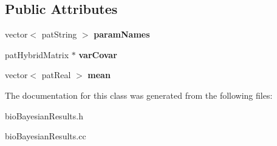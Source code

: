 \subsection*{Public Attributes}
\begin{DoxyCompactItemize}
\item 
\mbox{\label{classbio_bayesian_results_af7f5c9b0ff7ff04f12d0ab65a64aa6c2}} 
vector$<$ pat\+String $>$ {\bfseries param\+Names}
\item 
\mbox{\label{classbio_bayesian_results_ad3f390c3b245c0793801915097343769}} 
pat\+Hybrid\+Matrix $\ast$ {\bfseries var\+Covar}
\item 
\mbox{\label{classbio_bayesian_results_a61c9d40914afcf2ebd65e0a43d553230}} 
vector$<$ pat\+Real $>$ {\bfseries mean}
\end{DoxyCompactItemize}


The documentation for this class was generated from the following files\+:\begin{DoxyCompactItemize}
\item 
bio\+Bayesian\+Results.\+h\item 
bio\+Bayesian\+Results.\+cc\end{DoxyCompactItemize}
